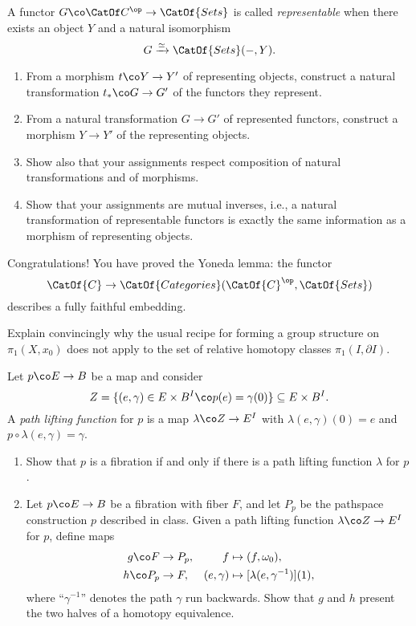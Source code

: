 \begin{problem}
A functor $G\co \CatOf C^{\op} \to \CatOf{Sets}$ is called \textit{representable} when there exists an object $Y$ and a natural isomorphism \[G \xrightarrow{\simeq} \CatOf{Sets}(-, Y).\]
\begin{enumerate}
    \item From a morphism $t\co Y \to Y'$ of representing objects, construct a natural transformation $t_*\co G \to G'$ of the functors they represent.
    \item From a natural transformation $G \to G'$ of represented functors, construct a morphism $Y \to Y'$ of the representing objects.
    \item Show also that your assignments respect composition of natural transformations and of morphisms.
    \item Show that your assignments are mutual inverses, i.e., a natural transformation of representable functors is exactly the same information as a morphism of representing objects.
\end{enumerate}
Congratulations! You have proved the Yoneda lemma: the functor \[\CatOf{C} \to \CatOf{Categories}(\CatOf{C}^{\op}, \CatOf{Sets})\]
describes a fully faithful embedding.
\end{problem}

\begin{problem}
Explain convincingly why the usual recipe for forming a group structure on $\pi_1(X, x_0)$ does not apply to the set of relative homotopy classes $\pi_1(I, \partial I)$.
\end{problem}

\begin{problem}
Let $p\co E \to B$ be a map and consider \[Z = \{(e, \gamma) \in E \times B^I \co p(e) = \gamma(0)\} \subseteq E \times B^I.\]  A \textit{path lifting function} for $p$ is a map $\lambda\co Z \to E^I$ with $\lambda(e, \gamma)(0) = e$ and $p \circ \lambda(e, \gamma) = \gamma$.
\begin{enumerate}
    \item Show that $p$ is a fibration if and only if there is a path lifting function $\lambda$ for $p$.
    \item Let $p\co E \to B$ be a fibration with fiber $F$, and let $P_p$ be the pathspace construction $p$ described in class.  Given a path lifting function $\lambda\co Z \to E^I$ for $p$, define maps
    \begin{align*}
    g\co F & \to P_p, & f & \mapsto (f, \omega_0), \\
    h\co P_p & \to F, & (e, \gamma) & \mapsto [\lambda(e, \gamma^{-1})](1),
    \end{align*}
    where ``$\gamma^{-1}$'' denotes the path $\gamma$ run backwards.  Show that $g$ and $h$ present the two halves of a homotopy equivalence.
\end{enumerate}
\end{problem}


